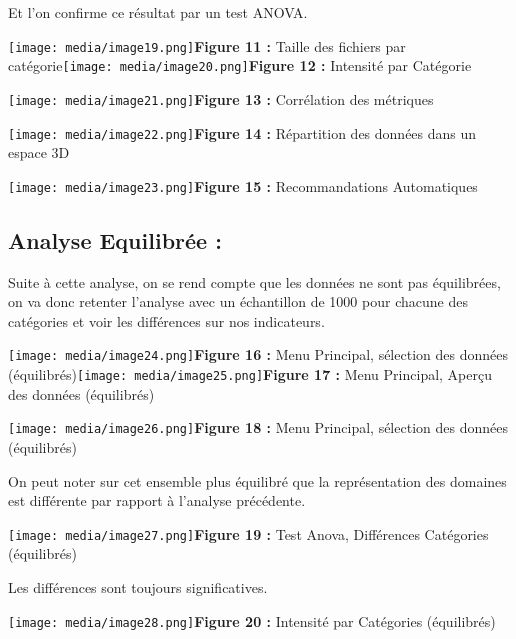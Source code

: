 Et l'on confirme ce résultat par un test ANOVA.

\texttt{[image: media/image19.png]}\textbf{Figure
11 :} Taille des fichiers par
catégorie\texttt{[image: media/image20.png]}\textbf{Figure
12 :} Intensité par Catégorie

\texttt{[image: media/image21.png]}\textbf{Figure
13 :} Corrélation des métriques

\texttt{[image: media/image22.png]}\textbf{Figure
14 :} Répartition des données dans un espace 3D

\texttt{[image: media/image23.png]}\textbf{Figure
15 :} Recommandations Automatiques

\subsection[Analyse Equilibrée
:]{\texorpdfstring{\protect\hypertarget{anchor-39}{}{}\protect\hypertarget{anchor-40}{}{}\protect\hypertarget{anchor-41}{}{}Analyse
Equilibrée :}{Analyse Equilibrée :}}\label{analyse-equilibruxe9e}

Suite à cette analyse, on se rend compte que les données ne sont pas
équilibrées, on va donc retenter l'analyse avec un échantillon de 1000
pour chacune des catégories et voir les différences sur nos indicateurs.

\texttt{[image: media/image24.png]}\textbf{Figure
16 :} Menu Principal, sélection des données
(équilibrés)\texttt{[image: media/image25.png]}\textbf{Figure
17 :} Menu Principal, Aperçu des données (équilibrés)

\texttt{[image: media/image26.png]}\textbf{Figure
18 :} Menu Principal, sélection des données (équilibrés)

On peut noter sur cet ensemble plus équilibré que la représentation des
domaines est différente par rapport à l'analyse précédente.

\texttt{[image: media/image27.png]}\textbf{Figure
19 :} Test Anova, Différences Catégories (équilibrés)

Les différences sont toujours significatives.

\texttt{[image: media/image28.png]}\textbf{Figure
20 :} Intensité par Catégories (équilibrés)


